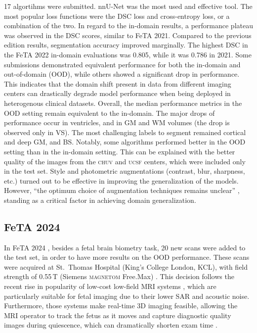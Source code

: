 17 algortihms were submitted. nnU-Net was the most used and effective tool. The most popular loss functions were the DSC loss and cross-entropy loss, or a combination of the two. In regard to the in-domain results, a performance plateau was observed in the DSC scores, similar to FeTA 2021. Compared to the previous edition results, segmentation accuracy improved marginally. The highest DSC in the FeTA 2022 in-domain evaluations was 0.805, while it was 0.786 in 2021. Some submissions demonstrated equivalent performance for both the in-domain and out-of-domain (OOD), while others showed a significant drop in performance. This indicates that the domain shift present in data from different imaging centers can drastically degrade model performance when being deployed in heterogenous clinical datasets. Overall, the median performance metrics in the OOD setting remain equivalent to the in-domain. The major drops of performance occur in ventricles, and in GM and WM volumes (the drop is observed only in VS). The most challenging labels to segment remained cortical and deep GM, and BS. Notably, some algorithms performed better in the OOD setting than in the in-domain setting. This can be explained with the better quality of the images from the \textsc{chuv} and \textsc{ucsf} centers, which were included only in the test set. Style and photometric augmentations (contrast, blur, sharpness, etc.) turned out to be effective in improving the generalization of the models. However, \enquote{the optimum choice of augmentation techniques remains unclear} \cite{FeTA2022_review}, standing as a critical factor in achieving domain generalization.

\subsection{FeTA 2024}

In FeTA 2024 \cite{FeTA2024}, besides a fetal brain biometry task, 20 new scans were added to the test set, in order to have more results on the OOD performance. These scans were acquired at St.\ Thomas Hospital (King's College London, KCL), with field strength of 0.55\,T (Siemens \textsc{magnetom} Free.Max) \cite{FeTA2024_paper}. This decision follows the recent rise in popularity of low-cost low-field MRI systems \cite{Aviles2023}, which are particularly suitable for fetal imaging due to their lower SAR and acoustic noise. Furthermore, those systems make real-time 3D imaging feasible, allowing the MRI operator to track the fetus as it moves and capture diagnostic quality images during quiescence, which can dramatically shorten exam time \cite{Ponrartana2023}.

